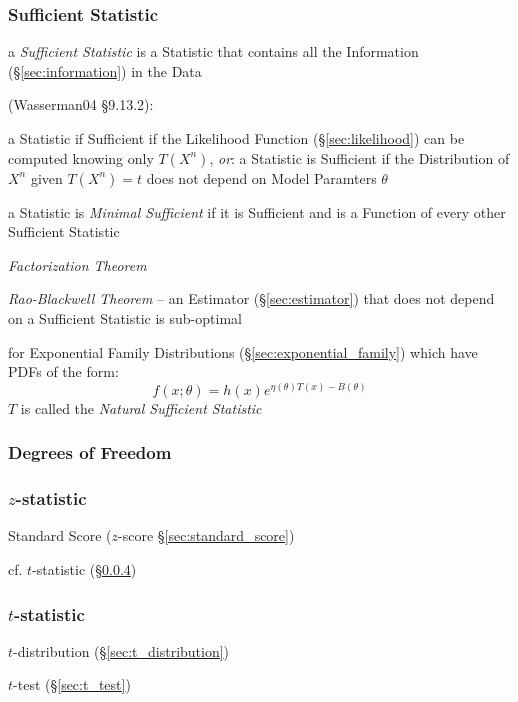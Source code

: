 \subsubsection{Sufficient Statistic}\label{sec:sufficient_statistic}

a \emph{Sufficient Statistic} is a Statistic that contains all the
Information (\S\ref{sec:information}) in the Data

(Wasserman04 \S9.13.2):

a Statistic if Sufficient if the Likelihood Function (\S\ref{sec:likelihood})
can be computed knowing only $T(X^n)$,
\emph{or}: a Statistic is Sufficient if the Distribution of $X^n$ given
$T(X^n) = t$ does not depend on Model Paramters $\theta$

a Statistic is \emph{Minimal Sufficient} if it is Sufficient and is a Function
of every other Sufficient Statistic

\emph{Factorization Theorem}

\emph{Rao-Blackwell Theorem} -- an Estimator (\S\ref{sec:estimator}) that does
not depend on a Sufficient Statistic is sub-optimal

for Exponential Family Distributions (\S\ref{sec:exponential_family}) which have
PDFs of the form:
\[
  f(x; \theta) = h(x) e^{\eta(\theta)T(x) - B(\theta)}
\]
$T$ is called the \emph{Natural Sufficient Statistic}



\subsubsection{Degrees of Freedom}\label{sec:statistical_freedom}

\subsubsection{$z$-statistic}\label{sec:z_statistic}

Standard Score ($z$-score \S\ref{sec:standard_score})

cf. $t$-statistic (\S\ref{sec:t_statistic})



\subsubsection{$t$-statistic}\label{sec:t_statistic}

$t$-distribution (\S\ref{sec:t_distribution})

$t$-test (\S\ref{sec:t_test})

